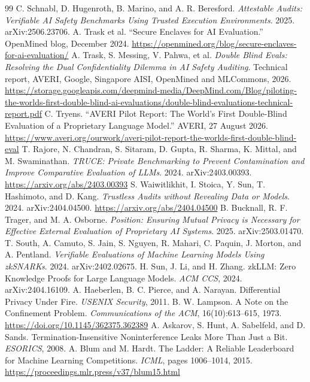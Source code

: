 \documentclass[10pt,twocolumn]{article}
\begin{document}
\begin{thebibliography}{99}
 C. Schnabl, D. Hugenroth, B. Marino, and A. R. Beresford. \emph{Attestable Audits: Verifiable AI Safety Benchmarks Using Trusted Execution Environments}. 2025. arXiv:2506.23706.
 A. Trask et al. ``Secure Enclaves for AI Evaluation.'' OpenMined blog, December 2024. \url{https://openmined.org/blog/secure-enclaves-for-ai-evaluation/}
 A. Trask, S. Messing, V. Pahwa, et al. \emph{Double Blind Evals: Resolving the Dual Confidentiality Dilemma in AI Safety Auditing}. Technical report, AVERI, Google, Singapore AISI, OpenMined and MLCommons, 2026. \url{https://storage.googleapis.com/deepmind-media/DeepMind.com/Blog/piloting-the-worlds-first-double-blind-ai-evaluations/double-blind-evaluations-technical-report.pdf}
 C. Tryens. ``AVERI Pilot Report: The World's First Double-Blind Evaluation of a Proprietary Language Model.'' AVERI, 27 August 2026. \url{https://www.averi.org/ourwork/averi-pilot-report-the-worlds-first-double-blind-eval}
 T. Rajore, N. Chandran, S. Sitaram, D. Gupta, R. Sharma, K. Mittal, and M. Swaminathan. \emph{TRUCE: Private Benchmarking to Prevent Contamination and Improve Comparative Evaluation of LLMs}. 2024. arXiv:2403.00393. \url{https://arxiv.org/abs/2403.00393}
 S. Waiwitlikhit, I. Stoica, Y. Sun, T. Hashimoto, and D. Kang. \emph{Trustless Audits without Revealing Data or Models}. 2024. arXiv:2404.04500. \url{https://arxiv.org/abs/2404.04500}
 B. Bucknall, R. F. Trager, and M. A. Osborne. \emph{Position: Ensuring Mutual Privacy is Necessary for Effective External Evaluation of Proprietary AI Systems}. 2025. arXiv:2503.01470.
 T. South, A. Camuto, S. Jain, S. Nguyen, R. Mahari, C. Paquin, J. Morton, and A. Pentland. \emph{Verifiable Evaluations of Machine Learning Models Using zkSNARKs}. 2024. arXiv:2402.02675.
 H. Sun, J. Li, and H. Zhang. zkLLM: Zero Knowledge Proofs for Large Language Models. \emph{ACM CCS}, 2024. arXiv:2404.16109.
 A. Haeberlen, B. C. Pierce, and A. Narayan. Differential Privacy Under Fire. \emph{USENIX Security}, 2011.
 B. W. Lampson. A Note on the Confinement Problem. \emph{Communications of the ACM}, 16(10):613--615, 1973. \url{https://doi.org/10.1145/362375.362389}
 A. Askarov, S. Hunt, A. Sabelfeld, and D. Sands. Termination-Insensitive Noninterference Leaks More Than Just a Bit. \emph{ESORICS}, 2008.
 A. Blum and M. Hardt. The Ladder: A Reliable Leaderboard for Machine Learning Competitions. \emph{ICML}, pages 1006--1014, 2015. \url{https://proceedings.mlr.press/v37/blum15.html}

\end{thebibliography}
\end{document}
